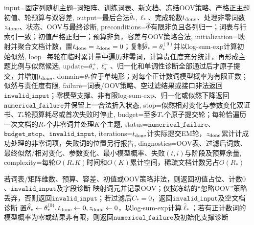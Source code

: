 \begin{AlgorithmContract}{
  input={固定列随机主题--词矩阵、训练词表、新文档、冻结OOV策略、严格正主题初值、轮预算与双容差},
  output={最后合法$\widehat\theta_*,\widehat\ell_*$、完成轮数$t_{\rm done}$、处理非零词数$z_{\rm done}$、状态、OOV与最终诊断},
  preconditions={$\widehat\Phi$有限非负且各列归一；词表与行索引一致；初值严格正归一；预算非负，容差与OOV策略合法},
  initialization={映射并聚合文档计数，置$t_{\rm done}=z_{\rm done}=0$；复制$\widehat\theta_*=\theta_*^{(0)}$并以log-sum-exp计算初始似然},
  loop={每轮在临时累计量中遍历非零词，计算责任度充分统计，再形成主题比例与似然候选},
  update={$\theta_*^+,\ell_*^+$、归一化和单调性诊断全部通过后才原子提交，并增加$t_{\rm done}$},
  domain={$\theta_*$位于单纯形；对每个正计数词模型概率为有限正数；似然与责任度有限},
  failure={词表/OOV策略、空过滤结果或接口非法返回$\mathtt{invalid\_input}$；零模型支撑、非有限log-sum-exp、归一化或似然下降返回$\mathtt{numerical\_failure}$并保留上一合法折入状态},
  stop={似然相对变化与参数变化双证书、$T_*$轮预算耗尽或首次失败时停止},
  budget={至多$T_*$个原子提交轮；每轮恰遍历一次文档的$R_*$个非零词并处理$K$个主题},
  status={$\mathtt{numerical\_failure}$、$\mathtt{budget\_stop}$、$\mathtt{invalid\_input}$},
  iterations={$t_{\rm done}$计实际提交EM轮，$z_{\rm done}$累计计成功处理的非零词项，失败词的位置另行报告},
  diagnostics={OOV表、过滤后词数、最终似然/相对变化、参数变化、最小模型概率、失败$(t,i)$与阶段及预算余量},
  complexity={每轮$O(R_*K)$时间和$O(K)$累计空间，稀疏文档计数另占$O(R_*)$}
}
\begin{algorithm}[tbp]
\caption{固定主题--词分布的新文档折入}\label{alg:V4-C06-plsa-foldin}
若词表/矩阵维数、预算、容差、初值或OOV策略非法，则返回初值占位、计数$0$、$\mathtt{invalid\_input}$及字段诊断\;
映射词元并记录OOV；仅按冻结的“忽略OOV”策略丢弃，否则返回$\mathtt{invalid\_input}$；若过滤后$C_*=0$，返回$\mathtt{invalid\_input}$及空文档诊断\;
置$\widehat\theta_*\leftarrow\theta_*^{(0)},t_{\rm done}\leftarrow0,z_{\rm done}\leftarrow0$，以log-sum-exp计算$\widehat\ell_*$；若有正计数词的模型概率为零或结果非有限，则返回$\mathtt{numerical\_failure}$及初始化支撑诊断\;
\end{algorithm}
\end{AlgorithmContract}
